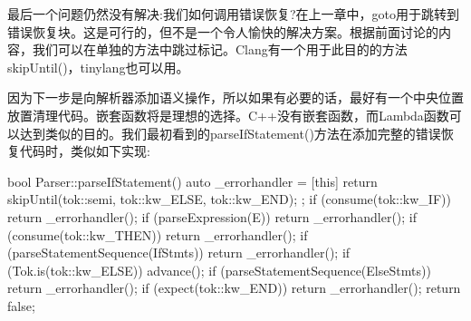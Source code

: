 最后一个问题仍然没有解决:我们如何调用错误恢复?在上一章中，goto用于跳转到错误恢复块。这是可行的，但不是一个令人愉快的解决方案。根据前面讨论的内容，我们可以在单独的方法中跳过标记。Clang有一个用于此目的的方法skipUntil()，tinylang也可以用。

因为下一步是向解析器添加语义操作，所以如果有必要的话，最好有一个中央位置放置清理代码。嵌套函数将是理想的选择。C++没有嵌套函数，而Lambda函数可以达到类似的目的。我们最初看到的parseIfStatement()方法在添加完整的错误恢复代码时，类似如下实现:

\begin{cpp}
bool Parser::parseIfStatement() {
    auto _errorhandler = [this] {
        return skipUntil(tok::semi, tok::kw_ELSE, tok::kw_END);
    };
    if (consume(tok::kw_IF))
        return _errorhandler();
    if (parseExpression(E))
        return _errorhandler();
    if (consume(tok::kw_THEN))
        return _errorhandler();
    if (parseStatementSequence(IfStmts))
        return _errorhandler();
    if (Tok.is(tok::kw_ELSE)) {
        advance();
        if (parseStatementSequence(ElseStmts))
        return _errorhandler();
    }
    if (expect(tok::kw_END))
        return _errorhandler();
    return false;
}
\end{cpp}

